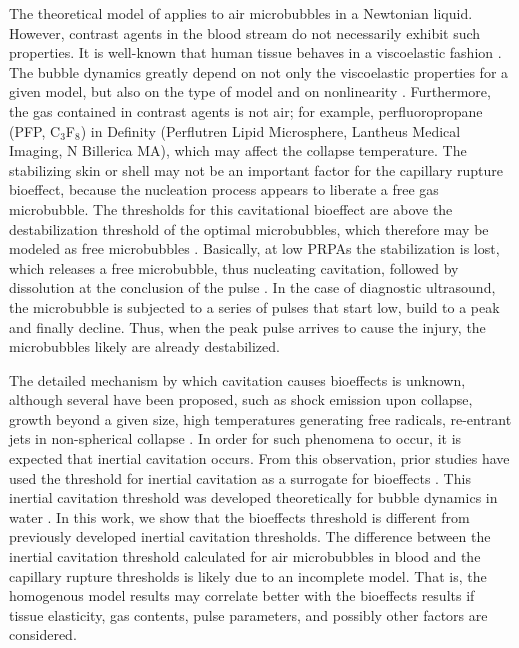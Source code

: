 \documentclass[%
preprint,%
author-year,%
]{jasatex}
\begin{document}
The theoretical model of \cite{apfel1991} applies to air microbubbles
in a Newtonian liquid. However, contrast agents in the blood stream do
not necessarily exhibit such properties. It is well-known that human
tissue behaves in a viscoelastic fashion
\cite[]{frizzell1976,madsen1983}. The bubble dynamics greatly depend
on not only the viscoelastic properties \cite[]{allen2000a,yang2005}
for a given model, but also on the type of model \cite[]{johnsen2012} and
on nonlinearity \cite[]{allen2000b}.  Furthermore, the gas contained
in contrast agents is not air; for example, perfluoropropane (PFP, C$_3$F$_8$) in
Definity (Perflutren Lipid Microsphere, Lantheus Medical Imaging, N
Billerica MA), which may affect the collapse temperature.  The
stabilizing skin or shell may not be an important factor for the
capillary rupture bioeffect, because the nucleation process appears to
liberate a free gas microbubble. The thresholds for this cavitational
bioeffect are above the destabilization threshold of the optimal
microbubbles, which therefore may be modeled as free microbubbles
\cite[]{sboros2002,marmottant2005}.  Basically, at low PRPAs the
stabilization is lost, which releases a free microbubble, thus
nucleating cavitation, followed by dissolution at the conclusion of
the pulse \cite[]{porter2006}.  In the case of diagnostic ultrasound,
the microbubble is subjected to
a series of pulses that start low, build to a peak and finally
decline.   Thus, when the peak pulse arrives to cause the injury, the 
microbubbles likely are already destabilized.

The detailed mechanism by which cavitation causes bioeffects is
unknown, although several have been proposed, such as shock emission
upon collapse, growth beyond a given size, high temperatures
generating free radicals, re-entrant jets in non-spherical collapse
\cite[]{nyborg2002}. In order for such phenomena to occur, it is
expected that inertial cavitation occurs. From this observation, prior
studies have used the threshold for inertial cavitation as a surrogate
for bioeffects \cite[]{yang2005}. This inertial cavitation threshold
was developed theoretically for bubble dynamics in water
\cite[]{flynn1975}. In this work, we show that the bioeffects
threshold is different from previously developed inertial cavitation
thresholds. The difference between the inertial cavitation threshold
calculated for air microbubbles in blood and the capillary rupture
thresholds is likely due to an incomplete model.  That is, the
homogenous model results may correlate better with the bioeffects
results if tissue elasticity, gas contents, pulse parameters, and
possibly other factors are considered.  
\end{document}
